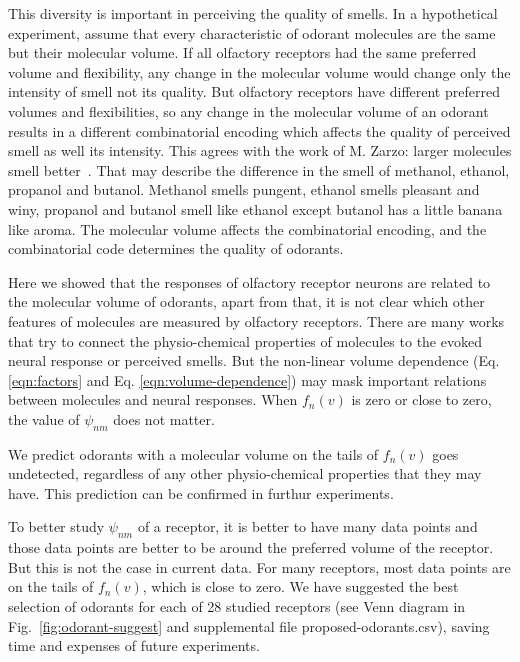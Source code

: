 \documentclass[landscape,a1paper,fontscale=0.6]{baposter} %
\newcommand{\numberofreceptors}{ 28 }
\begin{document}
\begin{poster}
{This diversity is important in perceiving the quality of smells. 
In a hypothetical experiment, 
assume that every characteristic of odorant molecules are the same but their molecular volume.
If all olfactory receptors had the same preferred volume and flexibility, 
any change in the molecular volume would change only the intensity of smell not its quality.
But olfactory receptors have different preferred volumes and flexibilities, 
so any change in the molecular volume of an odorant results in a different combinatorial encoding which affects the quality of perceived smell as well its intensity.
This agrees with the work of M. Zarzo: larger molecules  smell better~\cite{zarzo2011}.
That may describe the difference in the smell of methanol, ethanol, propanol and butanol. 
Methanol smells pungent, ethanol smells pleasant and winy, propanol and butanol smell like ethanol except butanol  has a little banana like aroma.
The molecular volume affects the combinatorial encoding, 
and the combinatorial code determines the quality of odorants.

Here we showed that the responses of olfactory receptor neurons are related to the molecular volume of odorants, 
apart from that, it is not clear which other features of molecules are measured by olfactory receptors. 
There are many works that try to connect the physio-chemical properties of molecules to the evoked neural response or perceived smells.
But the non-linear volume dependence (Eq. \ref{eqn:factors} and Eq. \ref{eqn:volume-dependence})  
may mask important relations between molecules and neural responses.
When $f_n(v)$ is zero or close to zero, 
the value of $\psi_{nm}$ does not matter. 

We predict odorants with a molecular volume on the tails of $f_n(v)$ goes undetected, 
regardless of any other physio-chemical properties that they may have. 
This prediction can be confirmed in furthur experiments. 

To better study $\psi_{nm}$ of a receptor, 
it is better to have many data points and those data points are better to be around the preferred volume of the receptor.
But this is not the case in current data. 
For many receptors, 
most data points are on the tails of $f_n(v)$, which is close to zero.
We have suggested the best selection of odorants for each of \numberofreceptors studied receptors 
(see Venn diagram in Fig.~\ref{fig:odorant-suggest} and supplemental file proposed-odorants.csv), 
saving time and expenses of future experiments. 


}
\end{poster}
\end{document}
